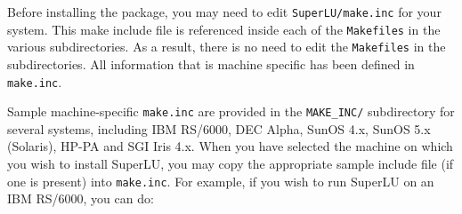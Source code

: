 Before installing the package, you may need to edit {\tt SuperLU/make.inc}
for your system.
This make include file is referenced inside each of the {\tt Makefiles}
in the various subdirectories. As a result, there is no need to 
edit the {\tt Makefiles} in the subdirectories. All information that is
machine specific has been defined in {\tt make.inc}.

Sample machine-specific {\tt make.inc} are provided 
in the {\tt MAKE\_INC/} subdirectory for several systems, including
IBM RS/6000, DEC Alpha, SunOS 4.x, SunOS 5.x (Solaris), HP-PA and
SGI Iris 4.x.  When you have selected the machine on which you wish 
to install SuperLU, you may copy the appropriate sample include file 
(if one is present) into {\tt make.inc}. For example, if you wish to run 
SuperLU on an IBM RS/6000, you can do:

\hspace{.4in}{\tt cp MAKE\_INC/make.rs6k make.inc}


